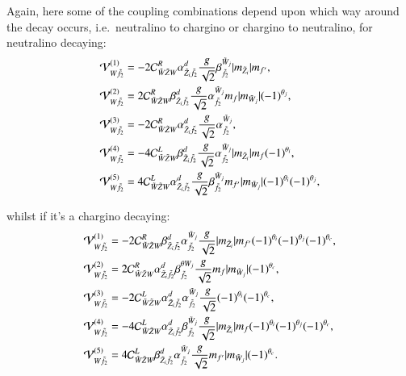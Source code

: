 \documentclass[final,3p,times]{elsarticle}
\begin{document}
Again, here some of the coupling combinations depend upon which way around the decay occurs, i.e.\ neutralino to chargino or chargino to neutralino, for neutralino decaying:
\begin{align}
\mathcal{V}_{W \tilde{f}_2}^{(1)} &= -2 \mathcal{C}_{\tilde{W} \tilde{Z} W}^R \alpha_{\tilde{Z}_i \tilde{f}_2}^{d} {g \over \sqrt{2}} \beta_{\tilde{f}_2}^{\tilde{W}_j}|m_{\tilde{Z}_i}|m_{f'}, \\
\mathcal{V}_{W \tilde{f}_2}^{(2)} &= 2 \mathcal{C}_{\tilde{W} \tilde{Z} W}^R \beta_{\tilde{Z}_i \tilde{f}_2}^{d} {g \over \sqrt{2}} \alpha_{\tilde{f}_2}^{\tilde{W}_j} m_{f} |m_{\tilde{W}_j}|(-1)^{\theta_j}, \\
\mathcal{V}_{W \tilde{f}_2}^{(3)} &= -2 \mathcal{C}_{\tilde{W} \tilde{Z} W}^R  \alpha_{\tilde{Z}_i \tilde{f}_2}^{d} {g \over \sqrt{2}} \alpha_{\tilde{f}_2}^{\tilde{W}_j}, \\
\mathcal{V}_{W \tilde{f}_2}^{(4)} &= -4 \mathcal{C}_{\tilde{W} \tilde{Z} W}^L \beta_{\tilde{Z}_i \tilde{f}_2}^{d} {g \over \sqrt{2}} \alpha_{\tilde{f}_2}^{\tilde{W}_j}|m_{\tilde{Z}_i}|m_{f}(-1)^{\theta_i}, \\
\mathcal{V}_{W \tilde{f}_2}^{(5)} &= 4 \mathcal{C}_{\tilde{W} \tilde{Z} W}^L \alpha_{\tilde{Z}_i \tilde{f}_2}^{d} {g \over \sqrt{2}} \beta_{\tilde{f}_2}^{\tilde{W}_j}m_{f'}|m_{\tilde{W}_j}|(-1)^{\theta_i}(-1)^{\theta_j},
\end{align}

whilst if it's a chargino decaying:
\begin{align}
\mathcal{V}_{W \tilde{f}_2}^{(1)} &= -2 \mathcal{C}_{\tilde{W} \tilde{Z} W}^R \beta_{\tilde{Z}_i \tilde{f}_2}^{d} \alpha_{\tilde{f}_2}^{\tilde{W}_j} {g \over \sqrt{2}} |m_{\tilde{Z}_i}|m_{f'}(-1)^{\theta_i}(-1)^{\theta_j}(-1)^{\theta_c}, \\
\mathcal{V}_{W \tilde{f}_2}^{(2)} &= 2 \mathcal{C}_{\tilde{W} \tilde{Z} W}^R \alpha_{\tilde{Z}_i \tilde{f}_2}^{d} \beta_{\tilde{f}_2}^{\theta{W}_j} {g \over \sqrt{2}} m_{f} |m_{\tilde{W}_j}|(-1)^{\theta_c}, \\
\mathcal{V}_{W \tilde{f}_2}^{(3)} &= -2 \mathcal{C}_{\tilde{W} \tilde{Z} W}^L \alpha_{\tilde{Z}_i \tilde{f}_2}^{d} \alpha_{\tilde{f}_2}^{\tilde{W}_j} {g \over \sqrt{2}} (-1)^{\theta_i} (-1)^{\theta_c}, \\
\mathcal{V}_{W \tilde{f}_2}^{(4)} &= -4 \mathcal{C}_{\tilde{W} \tilde{Z} W}^L \alpha_{\tilde{Z}_i \tilde{f}_2}^{d} \beta_{\tilde{f}_2}^{\tilde{W}_j} {g \over \sqrt{2}} |m_{\tilde{Z}_i}| m_{f} (-1)^{\theta_i}(-1)^{\theta_j}(-1)^{\theta_c}, \\
\mathcal{V}_{W \tilde{f}_2}^{(5)} &= 4 \mathcal{C}_{\tilde{W} \tilde{Z} W}^L \beta_{\tilde{Z}_i \tilde{f}_2}^{d} \alpha_{\tilde{f}_2}^{\tilde{W}_j}{g \over \sqrt{2}} m_{f'}|m_{\tilde{W}_j}| (-1)^{\theta_c}.
\end{align}
\end{document}
